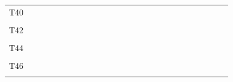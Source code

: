 \documentclass[
]{article}
\begin{document}
\begin{longtable}[l]{lllllllllllllllllllllllll}
T40 &  &  &  &  &  &  &  &  &  &  &  &  &  &  &  &  &  &  &  &  &  &  &  & \\
\addlinespace
\cellcolor{gray!6}{T41} & \cellcolor{gray!6}{} & \cellcolor{gray!6}{} & \cellcolor{gray!6}{} & \cellcolor{gray!6}{} & \cellcolor{gray!6}{} & \cellcolor{gray!6}{} & \cellcolor{gray!6}{} & \cellcolor{gray!6}{} & \cellcolor{gray!6}{} & \cellcolor{gray!6}{} & \cellcolor{gray!6}{} & \cellcolor{gray!6}{} & \cellcolor{gray!6}{} & \cellcolor{gray!6}{} & \cellcolor{gray!6}{} & \cellcolor{gray!6}{} & \cellcolor{gray!6}{} & \cellcolor{gray!6}{} & \cellcolor{gray!6}{} & \cellcolor{gray!6}{} & \cellcolor{gray!6}{} & \cellcolor{gray!6}{} & \cellcolor{gray!6}{} & \cellcolor{gray!6}{}\\
T42 &  &  &  &  &  &  &  &  &  &  &  &  &  &  &  &  &  &  &  &  &  &  &  & \\
\cellcolor{gray!6}{T43} & \cellcolor{gray!6}{} & \cellcolor{gray!6}{} & \cellcolor{gray!6}{} & \cellcolor{gray!6}{} & \cellcolor{gray!6}{} & \cellcolor{gray!6}{} & \cellcolor{gray!6}{} & \cellcolor{gray!6}{} & \cellcolor{gray!6}{} & \cellcolor{gray!6}{} & \cellcolor{gray!6}{} & \cellcolor{gray!6}{} & \cellcolor{gray!6}{} & \cellcolor{gray!6}{} & \cellcolor{gray!6}{} & \cellcolor{gray!6}{} & \cellcolor{gray!6}{} & \cellcolor{gray!6}{} & \cellcolor{gray!6}{} & \cellcolor{gray!6}{} & \cellcolor{gray!6}{} & \cellcolor{gray!6}{} & \cellcolor{gray!6}{} & \cellcolor{gray!6}{}\\
T44 &  &  &  &  &  &  &  &  &  &  &  &  &  &  &  &  &  &  &  &  &  &  &  & \\
\cellcolor{gray!6}{T45} & \cellcolor{gray!6}{} & \cellcolor{gray!6}{} & \cellcolor{gray!6}{} & \cellcolor{gray!6}{} & \cellcolor{gray!6}{} & \cellcolor{gray!6}{} & \cellcolor{gray!6}{} & \cellcolor{gray!6}{} & \cellcolor{gray!6}{} & \cellcolor{gray!6}{} & \cellcolor{gray!6}{} & \cellcolor{gray!6}{} & \cellcolor{gray!6}{} & \cellcolor{gray!6}{} & \cellcolor{gray!6}{} & \cellcolor{gray!6}{} & \cellcolor{gray!6}{} & \cellcolor{gray!6}{} & \cellcolor{gray!6}{} & \cellcolor{gray!6}{} & \cellcolor{gray!6}{} & \cellcolor{gray!6}{} & \cellcolor{gray!6}{} & \cellcolor{gray!6}{}\\
\addlinespace
T46 &  &  &  &  &  &  &  &  &  &  &  &  &  &  &  &  &  &  &  &  &  &  &  & \\
\cellcolor{gray!6}{T47} & \cellcolor{gray!6}{} & \cellcolor{gray!6}{} & \cellcolor{gray!6}{} & \cellcolor{gray!6}{} & \cellcolor{gray!6}{} & \cellcolor{gray!6}{} & \cellcolor{gray!6}{} & \cellcolor{gray!6}{} & \cellcolor{gray!6}{} & \cellcolor{gray!6}{} & \cellcolor{gray!6}{} & \cellcolor{gray!6}{} & \cellcolor{gray!6}{} & \cellcolor{gray!6}{} & \cellcolor{gray!6}{} & \cellcolor{gray!6}{} & \cellcolor{gray!6}{} & \cellcolor{gray!6}{} & \cellcolor{gray!6}{} & \cellcolor{gray!6}{} & \cellcolor{gray!6}{} & \cellcolor{gray!6}{} & \cellcolor{gray!6}{} & \cellcolor{gray!6}{}\\

\end{longtable}
\end{document}
